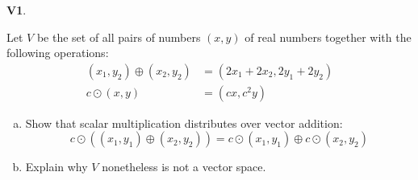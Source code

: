 \documentclass{article}
\newenvironment{problem}[1]
{
  \begin{flushleft}
  \textbf{#1}.
  \ignorespaces
}
{
  \end{flushleft}
}
\begin{document}
\begin{problem}{V1}
Let \(V\) be the set of all pairs of numbers \((x,y)\) of real numbers together with the following operations:
\begin{align*}
(x_1,y_2) \oplus (x_2,y_2) &= (2x_1+2x_2,2y_1+2y_2) \\
c\odot (x,y) &= (cx,c^2y)
\end{align*}
\begin{enumerate}[(a)]
\item Show that scalar multiplication distributes over vector addition:
\[c\odot \left((x_1,y_1) \oplus (x_2,y_2) \right) = c \odot (x_1,y_1) \oplus c \odot (x_2,y_2)\]
\item Explain why \(V\) nonetheless is not a vector space.
\end{enumerate}
\end{problem}
\end{document}
